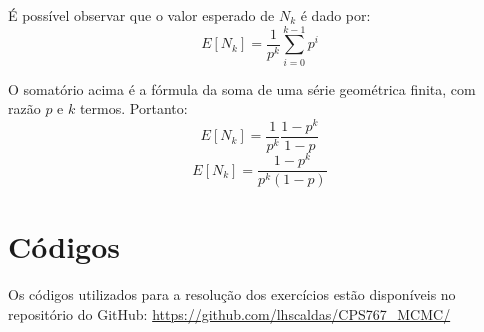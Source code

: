 \documentclass[12 pt]{article}
\begin{document}
\begin{enumerate}
\begin{tcolorbox}[colframe=black, title=Resposta(continuação):]
\begin{itemize}
            É possível observar que o valor esperado de $N_k$ é dado por:
            $$ E[N_k] = \frac{1}{p^k}\sum_{i=0}^{k-1} p^i $$

            O somatório acima é a fórmula da soma de uma série geométrica finita, com razão $p$ e $k$ termos. Portanto:
            $$ E[N_k] = \frac{1}{p^k} \frac{1 - p^k}{1 - p} $$
            $$ \boxed{E[N_k] = \frac{1 - p^k}{p^k(1 - p)}}$$
        \end{itemize}
    \end{tcolorbox}
\end{enumerate}

\section*{Códigos}

Os códigos utilizados para a resolução dos exercícios estão disponíveis no repositório do GitHub: \url{https://github.com/lhscaldas/CPS767_MCMC/}

\end{document}
